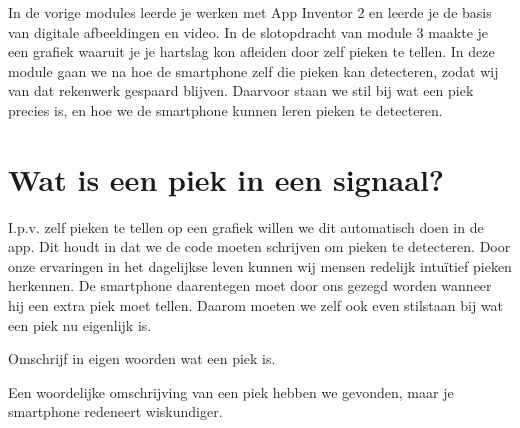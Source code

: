 \label{sec:piekdetectie}

\begin{samenvatting}
	In de vorige modules leerde je werken met App Inventor 2 en leerde je de basis van digitale afbeeldingen en video. In de slotopdracht van module 3 maakte je een grafiek waaruit je je hartslag kon afleiden door zelf pieken te tellen. In deze module gaan we na hoe de smartphone zelf die pieken kan detecteren, zodat wij van dat rekenwerk gespaard blijven. Daarvoor staan we stil bij wat een piek precies is, en hoe we de smartphone kunnen leren pieken te detecteren. 
\end{samenvatting}
%

\section{Wat is een piek in een signaal?}
\label{sec:Mod4_Sec1}
%
I.p.v. zelf pieken te tellen op een grafiek willen we dit automatisch doen in de app. Dit houdt in dat we de code moeten schrijven om pieken te detecteren. Door onze ervaringen in het dagelijkse leven kunnen wij mensen redelijk intu\"itief pieken herkennen. De smartphone daarentegen moet door ons gezegd worden wanneer hij een extra piek moet tellen. Daarom moeten we zelf ook even stilstaan bij wat een piek nu eigenlijk is.

\begin{steroef}
	Omschrijf in eigen woorden wat een piek is.
\end{steroef}

Een woordelijke omschrijving van een piek hebben we gevonden, maar je smartphone redeneert wiskundiger. 

